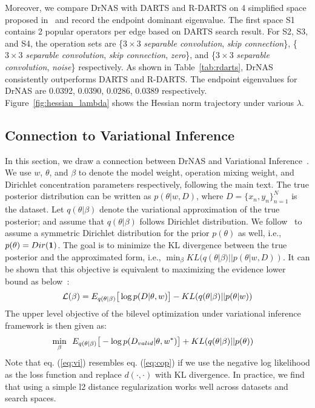\documentclass{article} \usepackage{iclr2021_conference,times}
\begin{document}
Moreover, we compare DrNAS with DARTS and R-DARTS on 4 simplified space proposed in~\citep{understanding} and record the endpoint dominant eigenvalue. The first space S1 contains 2 popular operators per edge based on DARTS search result. For S2, S3, and S4, the operation sets are \{$3\times 3$ \textit{separable convolution}, \textit{skip connection}\}, \{$3\times 3$ \textit{separable convolution}, \textit{skip connection}, \textit{zero}\}, and \{$3\times 3$ \textit{separable convolution}, \textit{noise}\} respectively.
As shown in Table~\ref{tab:rdarts}, DrNAS consistently outperforms DARTS and R-DARTS. The endpoint eigenvalues for DrNAS are 0.0392, 0.0390, 0.0286, 0.0389 respectively. 
Figure~\ref{fig:hessian_lambda} shows the Hessian norm trajectory under various $\lambda$.








\subsection{Connection to Variational Inference}
In this section, we draw a connection between DrNAS and Variational Inference~\citep{vi}.
We use $w$, $\theta$, and $\beta$ to denote the model weight, operation mixing weight, and Dirichlet concentration parameters respectively, following the main text.
The true posterior distribution can be written as $p(\theta|w, D)$, where $D = \{x_n, y_n\}_{n=1}^{N}$ is the dataset.
Let $q(\theta|\beta)$ denote the variational approximation of the true posterior; and assume that $q(\theta|\beta)$ follows Dirichlet distribution.
We follow~\citet{drvae} to assume a symmetric Dirichlet distribution for the prior $p(\theta)$ as well, i.e., $p(\theta) = Dir(\bold{1})$.
The goal is to minimize the KL divergence between the true posterior and the approximated form, i.e., $\min_{\beta} KL(q(\theta|\beta)||p(\theta|w, D))$.
It can be shown that this objective is equivalent to maximizing the evidence lower bound as below~\citep{vi}:
\begin{align}
    \mathcal{L}(\beta) = E_{q(\theta|\beta)}\big{[} \log{p(D|\theta, w)} \big{]} - KL(q(\theta|\beta)||p(\theta|w))
\end{align}
The upper level objective of the bilevel optimization under variational inference framework is then given as:
\begin{align}
    \label{eq:vi}
    \min_{\beta} &\  \ E_{q(\theta|\beta)}\big{[} -\log{p(D_{valid}|\theta, w^*)}\big{]} + KL(q(\theta|\beta)||p(\theta))
\end{align}
Note that eq. (\ref {eq:vi}) resembles eq. (\ref{eq:cop}) if we use the negative log likelihood as the loss function and replace $d(\cdot, \cdot)$ with KL divergence.
In practice, we find that using a simple l2 distance regularization works well across datasets and search spaces.
\end{document}
